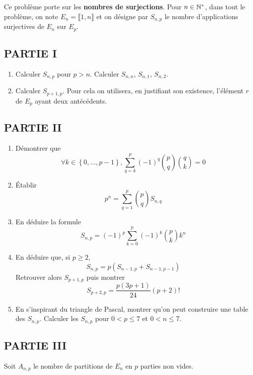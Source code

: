 Ce problème porte sur les \textbf{nombres de surjections}.\newline
Pour $n\in \mathbb{N}^*$, dans tout le probl{\`e}me, on note $E_{n} = \llbracket 1,n \rrbracket$ et on désigne par $S_{n,p}$ le nombre d'applications surjectives de $E_{n}$ sur $E_{p}$.

\subsection*{PARTIE I}
\begin{enumerate}
\item  Calculer $S_{n,p}$ pour $p>n$. Calculer $S_{n,n}$, $S_{n,1}$, $S_{n,2}$.

\item  Calculer $S_{p+1,p}$. Pour cela on utilisera, en justifiant son existence, l'{\'e}l{\'e}ment $r$ de $E_{p}$ ayant deux ant{\'e}c{\'e}dents.
\end{enumerate}

\subsection*{PARTIE II}
\begin{enumerate}
\item  D{\'e}montrer que
\[
\forall k\in \left\{ 0,\ldots ,p-1\right\} ,\sum_{q=k}^{p}(-1)^{q}\binom{p}{q}\binom{q}{k}=0
\]

\item  \'{E}tablir
\[
p^{n} = \sum_{q=1}^{p}\binom{p}{q}S_{n,q}
\]

\item  En d{\'e}duire la formule
\[
S_{n,p}=(-1)^{p}\sum_{k=0}^{p}(-1)^{k}\binom{p}{k}k^{n}
\]

\item  En d{\'e}duire que, si $p\geq 2$,
\[
S_{n,p}=p(S_{n-1,p}+S_{n-1,p-1})
\]
Retrouver alors $S_{p+1,p}$ puis montrer
\[
S_{p+2,p}=\frac{p(3p+1)}{24}(p+2)!
\]

\item  En s'inspirant du triangle de Pascal, montrer qu'on peut construire une table des $S_{n,p}$. Calculer les $S_{n,p}$ pour $0<p\leq 7$ et $0<n\leq 7$.
\end{enumerate}

\subsection*{PARTIE III}

Soit $A_{n,p}$ le nombre de partitions de $E_n$ en $p$ parties non vides.

